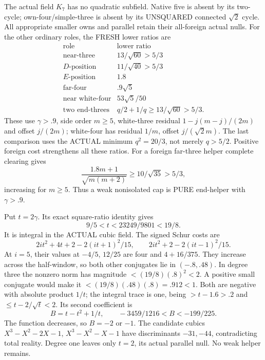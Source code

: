 \documentclass[11pt]{article}
\begin{document}
The actual field \(K_7\) has no quadratic
subfield.  Native five is absent by its
two-cycle; own-four/simple-three is absent
by its UNSQUARED connected \(\sqrt2\) cycle.
All appropriate smaller owns and parallel
retain their all-foreign actual nulls.
For the other ordinary roles, the FRESH
lower ratios are
\[
 \begin{array}{c|c}
 \text{role}&\text{lower ratio}\\ \hline
 \text{near-three}&13/\sqrt{60}>5/3\\
 D\text{-position}&11/\sqrt{40}>5/3\\
 E\text{-position}&1.8\\
 \text{far-four}&.9\sqrt5\\
 \text{near white-four}&53\sqrt5/50\\
 \text{two end-threes}&q/2+1/q\ge13/\sqrt{60}>5/3 .
 \end{array}
\]
These use \(\gamma>.9\), side order
\(m\ge5\), white-three residual
\(1-j(m-j)/(2m)\) and offset \(j/(2m)\);
white-four has residual \(1/m\), offset
\(j/(\sqrt2m)\).
The last comparison uses the ACTUAL minimum
\(q^2=20/3\), not merely \(q>5/2\).
Positive foreign cost strengthens all
these ratios.
For a foreign far-three helper complete
clearing gives
\[
        {\frac{1.8m+1}{\sqrt{m(m+2)}}}\ge10/\sqrt{35}>5/3 ,
\]
increasing for \(m\ge5\).
Thus a weak nonisolated cap is PURE
end-helper with \(\gamma>.9\).

Put \(t=2\gamma\).
Its exact square-ratio identity gives
\[
                      9/5<t<23249/9801<19/8 .
\]
It is integral in the ACTUAL cubic field.
The signed Schur costs are
\[
 2it^2+4t+2-2(it+1)^2/15,\qquad
 2it^2+2-2(it-1)^2/15 .
\]
At \(i=5\), their values at \(-4/5\),
\(12/25\) are four and \(4+16/375\).
They increase across the half-window,
so both other conjugates lie in
\((-.8,.48)\).
In degree three the nonzero norm has
magnitude \(<(19/8)(.8)^2<2\).
A positive small conjugate would make it
\(<(19/8)(.48)(.8)=.912<1\).
Both are negative with absolute product
\(1/t\); the integral trace is one,
being \(>t-1.6>.2\) and
\(\le t-2/\sqrt t<2\).
Its second coefficient is
\[
 B=t-t^2+1/t,\qquad
                    -3459/1216<B<-199/225 .
\]
The function decreases, so \(B=-2\) or
\(-1\).
The candidate cubics
\(X^3-X^2-2X-1\), \(X^3-X^2-X-1\)
have discriminants \(-31,-44\), contradicting
total reality.
Degree one leaves only \(t=2\), its
actual parallel null.
No weak helper remains.
\end{document}
